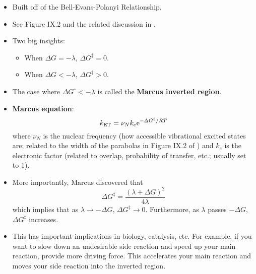 \documentclass[../notes.tex]{subfiles}
\begin{document}
\begin{itemize}
\begin{itemize}
        \item Built off of the Bell-Evans-Polanyi Relationship.
        \item See Figure IX.2 and the related discussion in \textcite{bib:CHEM20100Notes}.
        \item Two big insights:
        \begin{itemize}
            \item When $\Delta G=-\lambda$, $\Delta G^\ddagger=0$.
            \item When $\Delta G<-\lambda$, $\Delta G^\ddagger>0$.
        \end{itemize}
        \item The case where $\Delta G^\circ<-\lambda$ is called the \textbf{Marcus inverted region}.
        \item \textbf{Marcus equation}:
        \begin{equation*}
            k_\text{ET} = \nu_Nk_e\e[-\Delta G^\ddagger/RT]
        \end{equation*}
        where $\nu_N$ is the nuclear frequency (how accessible vibrational excited states are; related to the width of the parabolas in Figure IX.2 of \textcite{bib:CHEM20100Notes}) and $k_e$ is the electronic factor (related to overlap, probability of transfer, etc.; usually set to 1).
        \item More importantly, Marcus discovered that
        \begin{equation*}
            \Delta G^\ddagger = \frac{(\lambda+\Delta G)^2}{4\lambda}
        \end{equation*}
        which implies that as $\lambda\to -\Delta G$, $\Delta G^\ddagger\to 0$. Furthermore, as $\lambda$ passes $-\Delta G$, $\Delta G^\ddagger$ increases.
        \item This has important implications in biology, catalysis, etc. For example, if you want to slow down an undesirable side reaction and speed up your main reaction, provide more driving force. This accelerates your main reaction and moves your side reaction into the inverted region.
    \end{itemize}
\end{itemize}
\end{document}

